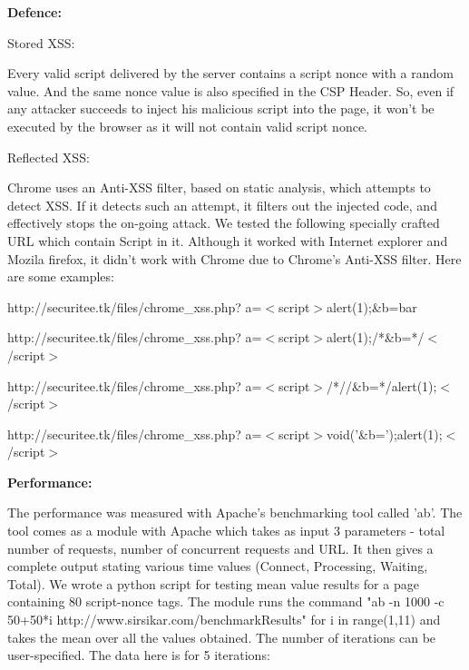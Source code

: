 \documentclass{article}
\begin{document}
\bigskip

\noindent
\textbf{Defence:}

\noindent Stored XSS:

Every valid script delivered by the server contains a script nonce with a random value. And the same nonce  value is also specified in the CSP Header. So, even if any attacker succeeds to inject his malicious script into the page, it won't be executed by the browser as it will not contain valid script nonce.

\noindent Reflected XSS:

Chrome uses an Anti-XSS filter, based on static analysis, which attempts to detect XSS. If it detects 
such an attempt, it filters out the injected code, and effectively stops the on-going attack.
We tested the following specially crafted URL which contain Script in it. Although it worked with Internet explorer and Mozila firefox, it didn't work with Chrome due to Chrome's Anti-XSS filter. Here are some examples:

http://securitee.tk/files/chrome\_xss.php?
a=$<$script$>$alert(1);\&b=bar

http://securitee.tk/files/chrome\_xss.php?
a=$<$script$>$alert(1);/*\&b=*/$<$/script$>$

http://securitee.tk/files/chrome\_xss.php?
a=$<$script$>$/*//\&b=*/alert(1);$<$/script$>$

http://securitee.tk/files/chrome\_xss.php?
a=$<$script$>$void('\&b=');alert(1);$<$/script$>$

\bigskip
\noindent
\textbf{Performance:} 
\medskip

The performance was measured with Apache's benchmarking tool called 'ab'. The tool comes as a module with Apache which takes as input 3 parameters - total number of requests, number of concurrent requests and URL. It then gives a complete output stating various time values (Connect, Processing, Waiting, Total).
We wrote a python script for testing mean value results for a page containing 80 script-nonce tags. The module runs the command "ab -n 1000 -c 50+50*i http://www.sirsikar.com/benchmarkResults" for i in range(1,11) and takes the mean over all the values obtained. The number of iterations can be user-specified. The data here is for 5 iterations:
\end{document}
